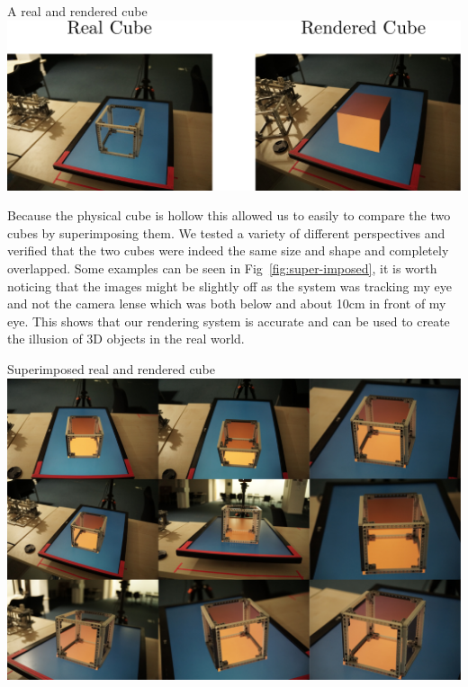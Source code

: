 \begin{figureBox}[label={fig:real-vs-rendered}, width=1.0\linewidth]{A real and rendered cube}
	\includegraphics[width = 1.0\linewidth]{./evaluation/figures/real-vs-rendered.pdf}
\end{figureBox}

Because the physical cube is hollow this allowed us to easily to compare the two cubes by superimposing them. We tested a variety of different perspectives and verified that the two cubes were indeed the same size and shape and completely overlapped. Some examples can be seen in Fig~\ref{fig:super-imposed}, it is worth noticing that the images might be slightly off as the system was tracking my eye and not the camera lense which was both below and about 10cm in front of my eye. This shows that our rendering system is accurate and can be used to create the illusion of 3D objects in the real world. 

\begin{figureBox}[label={fig:super-imposed}, width=1.0\linewidth]{Superimposed real and rendered cube}
	\includegraphics[width = 1.0\linewidth]{./evaluation/figures/super-imposed.pdf}
\end{figureBox}
